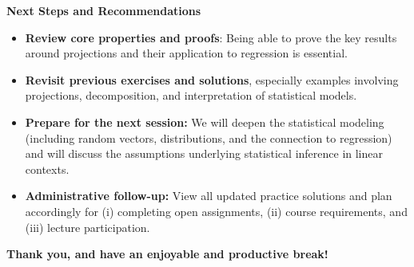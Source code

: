 \documentclass[11pt,a4paper]{article}
\theoremstyle{definition}
\theoremstyle{plain}
\theoremstyle{remark}
\begin{document}
\begin{administrative}
\textbf{Next Steps and Recommendations}

\begin{itemize}
    \item \textbf{Review core properties and proofs}: Being able to prove the key results around projections and their application to regression is essential.
    \item \textbf{Revisit previous exercises and solutions}, especially examples involving projections, decomposition, and interpretation of statistical models.
    \item \textbf{Prepare for the next session:} We will deepen the statistical modeling (including random vectors, distributions, and the connection to regression) and will discuss the assumptions underlying statistical inference in linear contexts.
    \item \textbf{Administrative follow-up:} View all updated practice solutions and plan accordingly for (i) completing open assignments, (ii) course requirements, and (iii) lecture participation.
\end{itemize}
\end{administrative}

\vspace{1cm}

\begin{center}
\textbf{Thank you, and have an enjoyable and productive break!}
\end{center}
\end{document}
